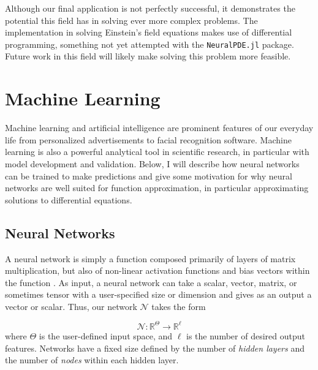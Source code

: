 \documentclass{CUP-JNL-DTM}%
\theoremstyle{definition}
\numberwithin{equation}{section}
\newcommand{\net}{\mathcal{N}}
\newcommand{\Define}{\emph}
\begin{document}
Although our final application is not perfectly successful, it demonstrates the potential this field has in solving ever more complex problems. The implementation in solving Einstein's field equations makes use of differential programming, something not yet attempted with the \texttt{NeuralPDE.jl} package. Future work in this field will likely make solving this problem more feasible. 



\section{Machine Learning}
\label{sec:ML}

Machine learning and artificial intelligence are prominent features of our everyday life from personalized advertisements to facial recognition software. Machine learning is also a powerful analytical tool in scientific research, in particular with model development and validation. Below, I will describe how neural networks can be trained to make predictions and give some motivation for why neural networks are well suited for function approximation, in particular approximating solutions to differential equations. 


\subsection{Neural Networks}

A neural network is simply a function composed primarily of layers of matrix multiplication, but also of non-linear activation functions and bias vectors within the function \cite{strangLinearAlgebraLearning2019, bishopPatternRecognitionMachine2006}. As input, a neural network can take a scalar, vector, matrix, or sometimes tensor with a user-specified size or dimension and gives as an output a vector or scalar. Thus, our network $\net$ takes the form

\begin{equation}
    \net : \mathbb{R}^{\Theta} \rightarrow \mathbb{R}^{\ell}
\end{equation}
where $\Theta$ is the user-defined input space, and $\ell$ is the number of desired output features. Networks have a fixed size defined by the number of \Define{hidden layers} and the number of \Define{nodes} within each hidden layer. 
\end{document}
